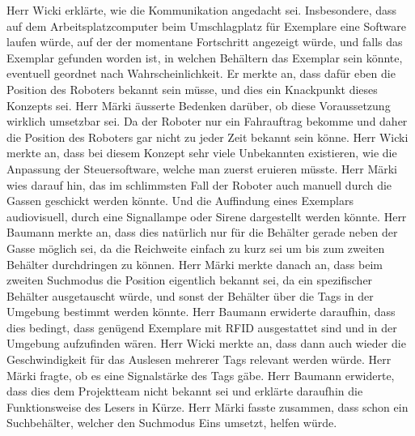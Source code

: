 \documentclass[parskip=full, a4paper]{scrreprt}
\begin{document}
Herr Wicki erklärte, wie die Kommunikation angedacht sei. Insbesondere, dass auf dem Arbeitsplatzcomputer beim Umschlagplatz für Exemplare eine Software laufen würde, auf der der momentane Fortschritt angezeigt würde, und falls das Exemplar gefunden worden ist, in welchen Behältern das Exemplar sein könnte, eventuell geordnet nach Wahrscheinlichkeit. Er merkte an, dass dafür eben die Position des Roboters bekannt sein müsse, und dies ein Knackpunkt dieses Konzepts sei. Herr Märki äusserte Bedenken darüber, ob diese Voraussetzung wirklich umsetzbar sei. Da der Roboter nur ein Fahrauftrag bekomme und daher die Position des Roboters gar nicht zu jeder Zeit bekannt sein könne.
Herr Wicki merkte an, dass bei diesem Konzept sehr viele Unbekannten existieren, wie die Anpassung der Steuersoftware, welche man zuerst eruieren müsste. Herr Märki wies darauf hin, das im schlimmsten Fall der Roboter auch manuell durch die Gassen geschickt werden könnte. Und die Auffindung eines Exemplars audiovisuell, durch eine Signallampe oder Sirene dargestellt werden könnte. Herr Baumann merkte an, dass dies natürlich nur für die Behälter gerade neben der Gasse möglich sei, da die Reichweite einfach zu kurz sei um bis zum zweiten Behälter durchdringen zu können.
Herr Märki merkte danach an, dass beim zweiten Suchmodus die Position eigentlich bekannt sei, da ein spezifischer Behälter ausgetauscht würde, und sonst der Behälter über die Tags in der Umgebung bestimmt werden könnte. Herr Baumann erwiderte daraufhin, dass dies bedingt, dass genügend Exemplare mit RFID ausgestattet sind und in der Umgebung aufzufinden wären. Herr Wicki merkte an, dass dann auch wieder die Geschwindigkeit für das Auslesen mehrerer Tags relevant werden würde.
Herr Märki fragte, ob es eine Signalstärke des Tags gäbe. Herr Baumann erwiderte, dass dies dem Projektteam nicht bekannt sei und erklärte daraufhin die Funktionsweise des Lesers in Kürze.
Herr Märki fasste zusammen, dass schon ein Suchbehälter, welcher den Suchmodus Eins umsetzt, helfen würde.
\end{document}
